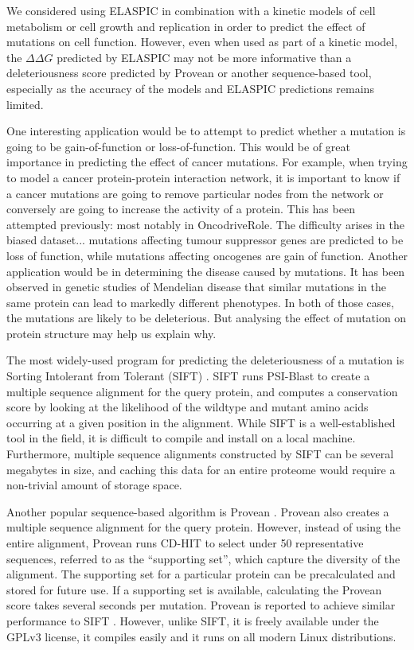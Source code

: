 We considered using ELASPIC in combination with a kinetic models of cell metabolism \cite{bordbar_personalized_2015} or cell growth and replication \cite{karr_whole-cell_2012} in order to predict the effect of mutations on cell function. However, even when used as part of a kinetic model, the $\Delta \Delta G$ predicted by ELASPIC may not be more informative than a deleteriousness score predicted by Provean or another sequence-based tool, especially as the accuracy of the models and ELASPIC predictions remains limited.

One interesting application would be to attempt to predict whether a mutation is going to be gain-of-function or loss-of-function. This would be of great importance in predicting the effect of cancer mutations. For example, when trying to model a cancer protein-protein interaction network, it is important to know if a cancer mutations are going to remove particular nodes from the network or conversely are going to increase the activity of a protein. This has been attempted previously: most notably in OncodriveRole. The difficulty arises in the biased dataset... mutations affecting tumour suppressor genes are predicted to be loss of function, while mutations affecting oncogenes are gain of function. Another application would be in determining the disease caused by mutations. It has been observed in genetic studies of Mendelian disease that similar mutations in the same protein can lead to markedly different phenotypes. In both of those cases, the mutations are likely to be deleterious. But analysing the effect of mutation on protein structure may help us explain why.





The most widely-used program for predicting the deleteriousness of a mutation is Sorting Intolerant from Tolerant (SIFT) \cite{ng_sift:_2003}. SIFT runs PSI-Blast to create a multiple sequence alignment for the query protein, and computes a conservation score by looking at the likelihood of the wildtype and mutant amino acids occurring at a given position in the alignment. While SIFT is a well-established tool in the field, it is difficult to compile and install on a local machine. Furthermore, multiple sequence alignments constructed by SIFT can be several megabytes in size, and caching this data for an entire proteome would require a non-trivial amount of storage space.

Another popular sequence-based algorithm is Provean \cite{choi_predicting_2012}. Provean also creates a multiple sequence alignment for the query protein. However, instead of using the entire alignment, Provean runs CD-HIT to select under 50 representative sequences, referred to as the ``supporting set'', which capture the diversity of the alignment. The supporting set for a particular protein can be precalculated and stored for future use. If a supporting set is available, calculating the Provean score takes several seconds per mutation. Provean is reported to achieve similar performance to SIFT \cite{choi_predicting_2012}. However, unlike SIFT, it is freely available under the GPLv3 license, it compiles easily and it runs on all modern Linux distributions.

